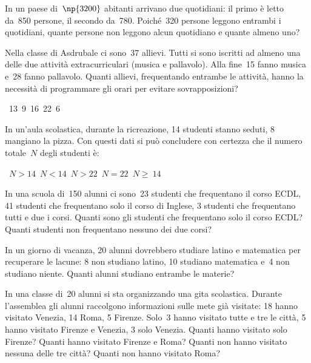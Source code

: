 \begin{multicols}{2}
\begin{esercizio}
\label{ese:7.33}
In un paese di~$\np{3200}$ abitanti arrivano due quotidiani: il primo è letto da~850
persone, il secondo da~780. Poiché~320 persone leggono entrambi i
quotidiani, quante persone non leggono alcun quotidiano e quante almeno uno?
\end{esercizio}

\begin{esercizio}
\label{ese:7.34}
Nella classe di Asdrubale ci sono~37 allievi. Tutti si sono iscritti
ad almeno una delle due attività extracurriculari (musica e
pallavolo). Alla fine~15 fanno musica e~28 fanno pallavolo.
Quanti allievi, frequentando entrambe le attività, hanno la
necessità di programmare gli orari per evitare sovrapposizioni?
\begin{center}
 \boxA~13\quad\boxB~9\quad\boxC~16\quad\boxD~22\quad\boxE~6
\end{center}
\end{esercizio}



\begin{esercizio}
\label{ese:7.35}
In un'aula scolastica, durante la ricreazione, 14
studenti stanno seduti, 8 mangiano la pizza. Con questi dati si può
concludere con certezza che il numero totale~$N$ degli studenti è:
\begin{center}
 \boxA\quad~$N>14$\quad\boxB\quad~$N<14$\quad\boxC\quad~$N>22$\quad\boxD\quad~$N = 22$\quad\boxE\quad~$N\ge~14$
\end{center}
\end{esercizio}


\begin{esercizio}
\label{ese:7.36}
In una scuola di~150 alunni ci sono~23 studenti che frequentano il corso ECDL, 41 studenti che frequentano solo il corso di Inglese, 3
studenti che frequentano tutti e due i corsi. Quanti sono gli studenti che frequentano solo il corso ECDL? Quanti studenti non frequentano
nessuno dei due corsi?
\end{esercizio}

\begin{esercizio}
\label{ese:7.37}
In un giorno di vacanza, 20 alunni dovrebbero studiare latino e
matematica per recuperare le lacune: 8 non studiano latino, 10 studiano
matematica e~4 non studiano niente. Quanti alunni studiano entrambe le
materie?
\end{esercizio}

\begin{esercizio}
\label{ese:7.38}
In una classe di~20 alunni si sta organizzando una gita
scolastica. Durante l'assemblea gli alunni raccolgono
informazioni sulle mete già visitate: 18 hanno visitato Venezia, 14
Roma, 5 Firenze. Solo~3 hanno visitato tutte e tre le città, 5 hanno
visitato Firenze e Venezia, 3 solo Venezia. Quanti hanno visitato solo
Firenze? Quanti hanno visitato Firenze e Roma? Quanti non hanno
visitato nessuna delle tre città? Quanti non hanno visitato Roma?
\end{esercizio}
\end{multicols}
